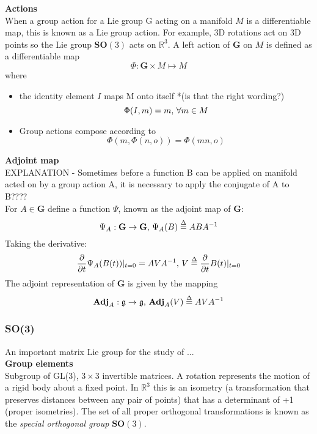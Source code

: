 		\textbf{Actions}\\
			When a group action for a Lie group G acting on a manifold $M$ is a differentiable map, this is known as a Lie group action. For example, 3D rotations act on 3D points so the Lie group $\mathbf{SO}(3)$ acts on $\mathbb{R}^3$. A left action of $\mathbf{G}$ on $M$ is defined as a differentiable map
			\begin{equation}
				\Phi: \mathbf{G} \times M \mapsto M
			\end{equation}
			where
			\begin{itemize}
			\item the identity element $I$ maps M onto itself *(is that the right wording?)
				\begin{equation}
					\Phi(I,m) = m \textnormal{, } \forall m \in M
				\end{equation}
			\item Group actions compose according to
				\begin{equation}
					\Phi(m,\Phi(n,o)) = \Phi(mn,o)
				\end{equation}
			\end{itemize}
			
		\textbf{Adjoint map}\\		
		EXPLANATION - Sometimes before a function B can be applied on manifold acted on by a group action A, it is necessary to apply the conjugate of A to B????\\
		For $A \in \mathbf{G}$ define a function $\Psi$, known as the adjoint map of $\mathbf{G}$:
		\begin{equation}
			\Psi_A: \mathbf{G} \rightarrow \mathbf{G} \textnormal{, }
			\Psi_A(B) \stackrel{\Delta}{=} ABA^{-1}
		\end{equation}
		Taking the derivative:
		\begin{equation}
			\frac{\partial}{\partial t} \Psi_A(B(t))|_{t=0} = AVA^{-1} \textnormal{, }
			V \stackrel{\Delta}{=} 	\frac{\partial}{\partial t}B(t)|_{t=0}
		\end{equation}
		The adjoint	representation of $\mathbf{G}$ is given by the mapping
		\begin{equation}
			\textbf{Adj}_A: \mathfrak{g} \rightarrow \mathfrak{g} \textnormal{, }
			\textbf{Adj}_A(V) \stackrel{\Delta}{=} AVA^{-1}
		\end{equation}
	
		
	\subsubsection{\textbf{SO}(3)}
		An important matrix Lie group for the study of ...\\
		\textbf{Group elements}\\
		Subgroup of GL(3), $3 \times 3$ invertible matrices.
		A rotation represents the motion of a rigid body about a fixed point. In $\mathbb{R}^3$ this is an isometry (a transformation that preserves distances between any pair of points) that has a determinant of +1 (proper isometries). The set of all proper orthogonal transformations is known as the \textit{special orthogonal group} $\textbf{SO}(3)$.
		
